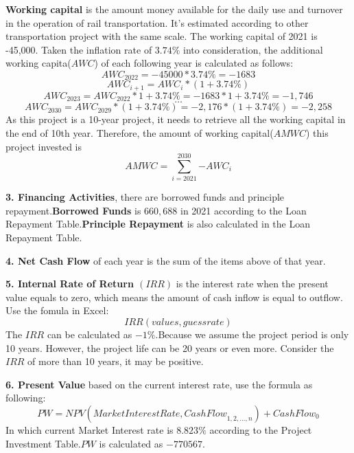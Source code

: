 \documentclass[12pt]{article}
\begin{document}
{\bfseries Working capital} is the amount money available for the daily use and turnover in the operation of rail transportation. It’s estimated according to other transportation project with the same scale. The working capital of 2021 is -45,000. Taken the inflation rate of $3.74\%$ into consideration, the additional working capita($AWC$) of each following year is calculated as follows:
\begin{equation}
  {AWC}_{2022}=-45000\ast3.74\%=-1683
\end{equation}
\begin{equation}\label{}
   {AWC}_{i+1}={AWC}_i\ast(1+3.74\%)
\end{equation}
\begin{equation}\label{}
  {AWC}_{2023}={AWC}_{2022}\ast1+3.74\%=-1683*1+3.74\%=-1,746
\end{equation}
$$\ldots$$
\begin{equation}\label{}
  {AWC}_{2030}={AWC}_{2029}\ast(1+3.74\%)=-2,176\ast(1+3.74\%)=-2,258
\end{equation}
As this project is a 10-year project, it needs to retrieve all the working capital in the end of 10th year. Therefore, the amount of working capital($AMWC$) this project invested is
\begin{equation}\label{}
  AMWC=\sum_{i=2021}^{2030}{-AWC_i}
\end{equation}

\par {\bfseries 3. Financing Activities}, there are borrowed funds and principle repayment.{\bfseries Borrowed Funds }is $660,688$ in 2021 according to the Loan Repayment Table.{\bfseries Principle Repayment} is also calculated in the Loan Repayment Table.
\par {\bfseries 4. Net Cash Flow} of each year is the sum of the items above of that year.
\par {\bfseries 5. Internal Rate of Return $(IRR)$} is the interest rate when the present value equals to zero, which means the amount of cash inflow is equal to outflow. Use the fomula in Excel:
\begin{equation}\label{}
  IRR(values, guess rate)
\end{equation}
The $IRR$ can be calculated as $-1\%$.Because we assume the project period is only 10 years. However, the project life can be 20 years or even more. Consider the $IRR$ of more than 10 years, it may be positive.
\par {\bfseries 6. Present Value} based on the current interest rate, use the formula as following:
\begin{equation}\label{}
  PW=NPV({MarketInterestRate,CashFlow}_{1,2,\ldots,n})+{CashFlow}_0
\end{equation}
In which current Market Interest rate is $8.823\%$ according to the Project Investment Table.$PW$ is calculated as $-770567$.
\end{document}
